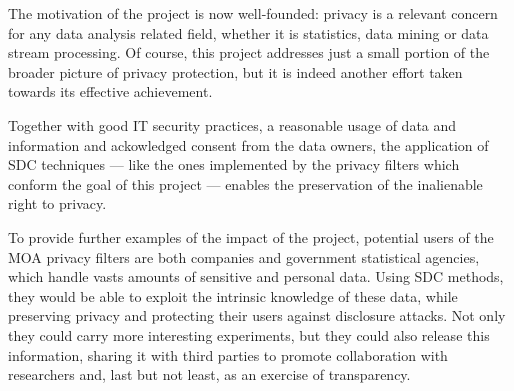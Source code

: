 The motivation of the project is now well-founded: privacy is a relevant concern for any data analysis related field, whether it is statistics, data mining or data stream processing. Of course, this project addresses just a small portion of the broader picture of privacy protection, but it is indeed another effort taken towards its effective achievement.

Together with good IT security practices, a reasonable usage of data and information and ackowledged consent from the data owners, the application of SDC techniques --- like the ones implemented by the privacy filters which conform the goal of this project --- enables the preservation of the inalienable right to privacy.

To provide further examples of the impact of the project, potential users of the MOA privacy filters are both companies and government statistical agencies, which handle vasts amounts of sensitive and personal data. Using SDC methods, they would be able to exploit the intrinsic knowledge of these data, while preserving privacy and protecting their users against disclosure attacks. Not only they could carry more interesting experiments, but they could also release this information, sharing it with third parties to promote collaboration with researchers and, last but not least, as an exercise of transparency.